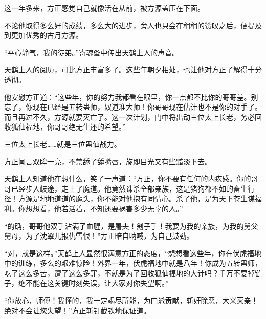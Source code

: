 \begin{this_body}
这一年多来，方正感觉自己就像活在从前，被方源盖压在下面。

不论他取得多么好的成绩，多么大的进步，旁人也只会在稍稍的赞叹之后，便提及到更加优秀的古月方源。

“平心静气，我的徒弟。”寄魂蚤中传出天鹤上人的声音。

天鹤上人的阅历，可比方正丰富多了。这些年朝夕相处，也让他对方正了解得十分透彻。

他安慰方正道：“这些年，你的努力我都看在眼里，你一点都不比你的哥哥差。别忘了，你现在已经是五转蛊师，奴道准大师！你哥哥现在估计也不是你的对手了。而且再过不久，方源就要灭亡了。这一次计划，门中将出动三位太上长老，务必回收狐仙福地，你哥哥绝无生还的希望。”

三位太上长老……就是三位蛊仙战力。

方正闻言双眸一亮，不禁舔了舔嘴唇，旋即目光又有些黯淡下去。

天鹤上人知道他在想什么，笑了一声道：“方正，你不要有任何的内疚感。你的哥哥已经步入歧途，走上了魔道。他竟然诛杀全部亲族，这是猪狗都不如的畜生行径！方源是地地道道的魔头，你不能对他抱有同情心。杀了他，是为天下苍生谋福利。你想想看，他若活着，不知还要祸害多少无辜的人。”

“的确，哥哥他双手沾满了血腥，是屠夫！刽子手！我要为我的亲族，为我的舅父舅母，为了沈翠儿报仇雪恨！”方正暗自呐喊，为自己鼓劲。

“对，就是这样。”天鹤上人显然很满意方正的态度，“想想看这些年，你在伏虎福地中的训练，多么的艰难惊险！外界一年，伏虎福地中就是八年！你成为五转蛊师，吃了这么多苦，遭了这么多罪，不就是为了回收狐仙福地的大计吗？千万不要掉链子，绝不能在这关键时刻失误，让大家对你失望啊。”

“你放心，师傅！我懂的，我一定竭尽所能，为门派贡献，斩奸除恶，大义灭亲！绝对不会让您失望！”方正斩钉截铁地保证道。

\end{this_body}


